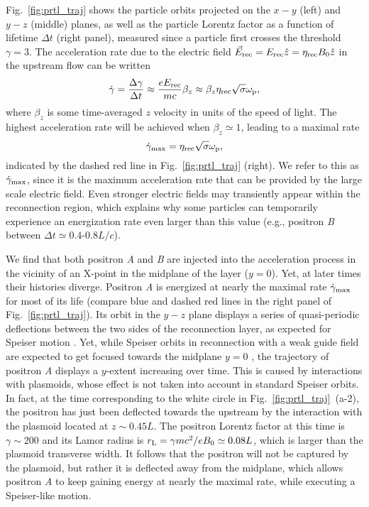 \documentclass[twocolumn,twocolappendix]{aastex63}
\newcommand{\omp}{\omega_{\rm p}}
\begin{document}
Fig.~\ref{fig:prtl_traj} shows the particle orbits projected on the $x-y$ (left) and $y-z$ (middle) planes, as well as the particle Lorentz factor as a function of lifetime $\Delta t$ (right panel), measured since a particle first crosses the threshold $\gamma=3$. The acceleration rate due to the electric field $\vec{E}_{\rm rec}=E_{\rm rec}\hat{z}=\eta_{\rm rec}B_0 \hat{z}$ in the upstream flow can be written
\begin{equation}\label{eq:acc_rate}
    \dot{\gamma} =\frac{\Delta \gamma}{\Delta t} \approx \frac{ e E_{\rm rec}}{mc} \beta_z \approx \beta_z\eta_{\rm rec}\sqrt{\sigma} \omp,
\end{equation}
where $\beta_z$ is some time-averaged $z$ velocity in units of the speed of light. The highest acceleration rate will be achieved when $\beta_z\simeq 1$, leading to a maximal rate 
\begin{equation}\label{eq:ratemax}
\dot{\gamma}_{\rm max}=\eta_{\rm rec}\sqrt{\sigma}\omp,
\end{equation}
indicated by the dashed red line in Fig.~\ref{fig:prtl_traj} (right). We refer to this as $\dot{\gamma}_{\rm max}$, since it is the maximum acceleration rate that can be provided by the large scale electric field. Even stronger electric fields may transiently appear  within the reconnection region, which explains why some particles can temporarily experience an energization rate even larger than this value (e.g., positron \emph{B} between $\Delta t\simeq0.4$-$0.8L/c$).

We find that both positron \emph{A} and \emph{B} are injected into the acceleration process in the vicinity of an X-point in the midplane of the layer ($y=0$). Yet, at later times their histories diverge. 
Positron \emph{A} is energized at nearly the maximal rate $\dot{\gamma}_{\rm max}$ for most of its life (compare blue and dashed red lines in the right panel of Fig.~\ref{fig:prtl_traj}). Its orbit in the $y-z$ plane displays a series of quasi-periodic deflections between the two sides of the reconnection layer, as expected for Speiser motion \citep{speiser_65}. Yet, while Speiser orbits in reconnection with a weak guide field are expected to get focused towards the midplane $y=0$ \citep[e.g.,][]{cerutti_13a}, the trajectory of positron \emph{A} displays a $y$-extent increasing over time. This is caused by interactions with plasmoids, whose effect is  not taken into account in standard Speiser orbits. In fact, at the time corresponding to the white circle in Fig.~\ref{fig:prtl_traj}~(a-2), the positron has just been deflected towards the upstream by the interaction with the plasmoid located at $z\sim 0.45 L$. The positron Lorentz factor at this time is $\gamma\sim 200$ and its Lamor radius is $r_{\rm L} =\gamma m c^2/eB_0\simeq 0.08L$, which is larger than the plasmoid transverse width. It follows that the positron will not be captured by the plasmoid, but rather it is deflected away from the midplane, which allows positron \emph{A} to keep gaining energy at nearly the maximal rate, while executing a Speiser-like motion.
\end{document}
